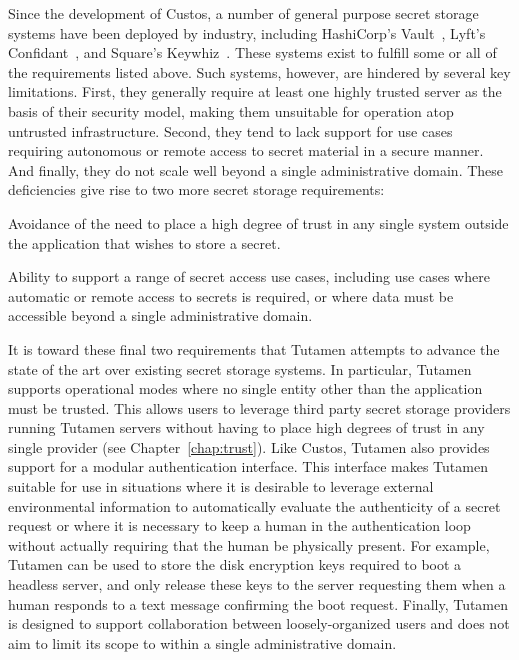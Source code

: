 Since the development of Custos, a number of general purpose secret
storage systems have been deployed by industry, including HashiCorp's
Vault~\cite{vault}, Lyft's Confidant~\cite{confidant}, and Square's
Keywhiz~\cite{keywhiz}. These systems exist to fulfill some or all of
the requirements listed above. Such systems, however, are hindered by
several key limitations. First, they generally require at least one
highly trusted server as the basis of their security model, making
them unsuitable for operation atop untrusted infrastructure. Second,
they tend to lack support for use cases requiring autonomous or remote
access to secret material in a secure manner. And finally, they do not
scale well beyond a single administrative domain. These deficiencies
give rise to two more secret storage requirements:

\begin{packed_item}
\item Avoidance of the need to place a high degree of trust in any
  single system outside the application that wishes to store a secret.
\item Ability to support a range of secret access use cases, including
  use cases where automatic or remote access to secrets is required,
  or where data must be accessible beyond a single administrative
  domain.
\end{packed_item}

It is toward these final two requirements that Tutamen attempts to
advance the state of the art over existing secret storage systems. In
particular, Tutamen supports operational modes where no single entity
other than the application must be trusted. This allows users to
leverage third party secret storage providers running Tutamen servers
without having to place high degrees of trust in any single provider
(see Chapter~\ref{chap:trust}). Like Custos, Tutamen also provides
support for a modular authentication interface. This interface makes
Tutamen suitable for use in situations where it is desirable to
leverage external environmental information to automatically evaluate
the authenticity of a secret request or where it is necessary to keep
a human in the authentication loop without actually requiring that the
human be physically present. For example, Tutamen can be used to store
the disk encryption keys required to boot a headless server, and only
release these keys to the server requesting them when a human responds
to a text message confirming the boot request. Finally, Tutamen is
designed to support collaboration between loosely-organized users and
does not aim to limit its scope to within a single administrative
domain.

